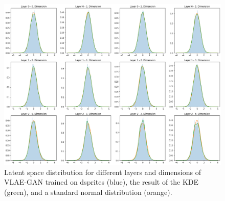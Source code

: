 \documentclass[11pt,a4paper]{article}
\begin{document}
\begin{figure}[H]
\centering
\includegraphics[width=\textwidth]{images/generated_vs_true/dsprites/vlae_gan_kde.png}
\caption[\ac{VLAE}-\ac{GAN} on dsprites: Estimated Latent Space Distribution]{Latent space distribution for different layers and dimensions of \ac{VLAE}-\ac{GAN} trained on dsprites (blue), the result of the \ac{KDE} (green), and a standard normal distribution (orange).}
\end{figure}

\pagebreak
\end{document}
